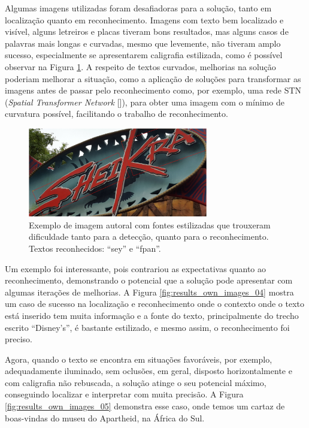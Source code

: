Algumas imagens utilizadas foram desafiadoras para a solução, tanto em localização quanto em reconhecimento. Imagens 
com texto bem localizado e visível, alguns letreiros e placas tiveram bons resultados, mas alguns casos de palavras mais longas 
e curvadas, mesmo que levemente, não tiveram amplo sucesso, especialmente se apresentarem caligrafia estilizada, como é 
possível observar na Figura \ref{fig:results_own_images_03}. A respeito de textos curvados, melhorias na solução poderiam 
melhorar a situação, como a aplicação de soluções para transformar as imagens antes de passar pelo reconhecimento como, por 
exemplo, uma rede STN (\textit{Spatial Transformer Network} []), para obter uma imagem com o mínimo de 
curvatura possível, facilitando o trabalho de reconhecimento.

\begin{figure}
    \centering
    \includegraphics[width=0.7\textwidth]{figs/resultados-autoral-03.png}
    \caption{Exemplo de imagem autoral com fontes estilizadas que trouxeram dificuldade tanto para a detecção, quanto 
    para o reconhecimento. Textos reconhecidos: “sey” e “fpan”.}
    \label{fig:results_own_images_03}
\end{figure}


Um exemplo foi interessante, pois contrariou as expectativas quanto ao reconhecimento, demonstrando o potencial que a 
solução pode apresentar com algumas iterações de melhorias. A Figura \ref{fig:results_own_images_04} mostra um caso de sucesso 
na localização e reconhecimento onde o contexto onde o texto está inserido tem muita informação e a fonte do texto, 
principalmente do trecho escrito “Disney’s”, é bastante estilizado, e mesmo assim, o reconhecimento foi preciso.


Agora, quando o texto se encontra em situações favoráveis, por exemplo, adequadamente iluminado, sem oclusões, em geral, disposto 
horizontalmente e com caligrafia não rebuscada, a solução atinge o seu potencial máximo, conseguindo localizar e interpretar 
com muita precisão. A Figura \ref{fig:results_own_images_05} demonstra esse caso, onde temos um cartaz de boas-vindas do 
museu do Apartheid, na África do Sul.

